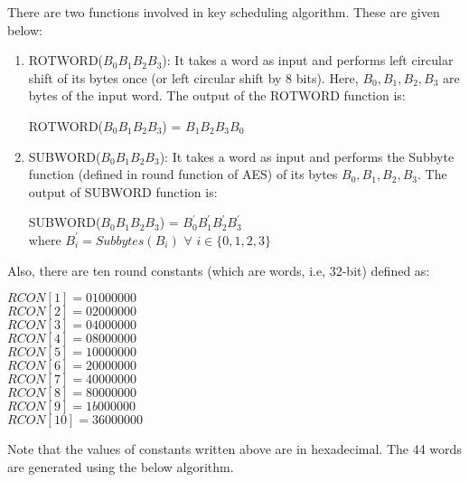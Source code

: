 \documentclass[11pt]{article}
\begin{document}
There are two functions involved in key scheduling algorithm. These are given below:
\begin{enumerate}
    \item ROTWORD($B_0B_1B_2B_3$): It takes a word as input and performs left circular shift of its bytes once (or left circular shift by 8 bits). Here, $B_0, B_1, B_2, B_3$ are bytes of the input word. The output of the ROTWORD function is:
    \begin{center}
        ROTWORD($B_0B_1B_2B_3$) = $B_1B_2B_3B_0$
    \end{center}

    \item SUBWORD($B_0B_1B_2B_3$): It takes a word as input and performs the Subbyte function (defined in round function of AES) of its bytes $B_0, B_1, B_2, B_3$. The output of SUBWORD function is:
    \begin{center}
        SUBWORD($B_0B_1B_2B_3$) = $B_0^{'} B_1^{'} B_2^{'} B_3^{'}$\\
        where $B_i^{'} = Subbytes(B_i)$ $\forall$ $i \in \{0,1,2,3\}$
    \end{center}
\end{enumerate}
Also, there are ten round constants (which are words, i.e, 32-bit) defined as:
\begin{center}
    $RCON[1] = 01000000$\\
    $RCON[2] = 02000000$\\
    $RCON[3] = 04000000$\\
    $RCON[4] = 08000000$\\
    $RCON[5] = 10000000$\\
    $RCON[6] = 20000000$\\
    $RCON[7] = 40000000$\\
    $RCON[8] = 80000000$\\
    $RCON[9] = 1b000000$\\
    $RCON[10] = 36000000$\\
\end{center}
Note that the values of constants written above are in hexadecimal. The 44 words are generated using the below algorithm.
\begin{center}
    \begin{algorithm}
    
    \end{algorithm}
\end{center}
\end{document}
